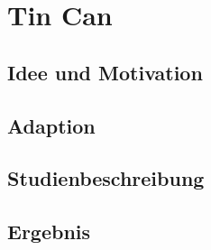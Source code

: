 \section{Tin Can}


\subsection{Idee und Motivation}

\subsection{Adaption}

\subsection{Studienbeschreibung}


\subsection{Ergebnis}

